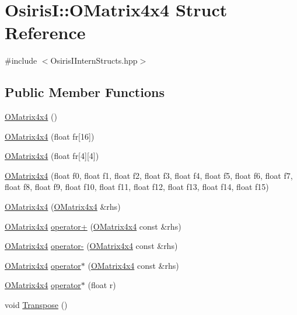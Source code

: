 \hypertarget{struct_osiris_i_1_1_o_matrix4x4}{\section{Osiris\-I\-:\-:O\-Matrix4x4 Struct Reference}
\label{struct_osiris_i_1_1_o_matrix4x4}
}


{\ttfamily \#include $<$Osiris\-I\-Intern\-Structs.\-hpp$>$}

\subsection*{Public Member Functions}
\begin{DoxyCompactItemize}
\item 
\hyperlink{struct_osiris_i_1_1_o_matrix4x4_ae5acc0e7919ce96adf6f6973d2d1c2a1}{O\-Matrix4x4} ()
\item 
\hyperlink{struct_osiris_i_1_1_o_matrix4x4_afedfdb77f304e823d5d5089d33df5e6e}{O\-Matrix4x4} (float fr\mbox{[}16\mbox{]})
\item 
\hyperlink{struct_osiris_i_1_1_o_matrix4x4_ab49b4aa64bdbd2a30412469de5f6f8b3}{O\-Matrix4x4} (float fr\mbox{[}4\mbox{]}\mbox{[}4\mbox{]})
\item 
\hyperlink{struct_osiris_i_1_1_o_matrix4x4_af575bd7166894f9fa08008a9c94caed0}{O\-Matrix4x4} (float f0, float f1, float f2, float f3, float f4, float f5, float f6, float f7, float f8, float f9, float f10, float f11, float f12, float f13, float f14, float f15)
\item 
\hyperlink{struct_osiris_i_1_1_o_matrix4x4_afe68ae85be836adee13fa3c379a2e991}{O\-Matrix4x4} (\hyperlink{struct_osiris_i_1_1_o_matrix4x4}{O\-Matrix4x4} \&rhs)
\item 
\hyperlink{struct_osiris_i_1_1_o_matrix4x4}{O\-Matrix4x4} \hyperlink{struct_osiris_i_1_1_o_matrix4x4_a2962c18c1d0bdd65e0d6e8e4d78b6830}{operator+} (\hyperlink{struct_osiris_i_1_1_o_matrix4x4}{O\-Matrix4x4} const \&rhs)
\item 
\hyperlink{struct_osiris_i_1_1_o_matrix4x4}{O\-Matrix4x4} \hyperlink{struct_osiris_i_1_1_o_matrix4x4_a42007ce580566d6d7031d8f02b7c1534}{operator-\/} (\hyperlink{struct_osiris_i_1_1_o_matrix4x4}{O\-Matrix4x4} const \&rhs)
\item 
\hyperlink{struct_osiris_i_1_1_o_matrix4x4}{O\-Matrix4x4} \hyperlink{struct_osiris_i_1_1_o_matrix4x4_aee32c86843495fc4acab0f76f96e0d6e}{operator$\ast$} (\hyperlink{struct_osiris_i_1_1_o_matrix4x4}{O\-Matrix4x4} const \&rhs)
\item 
\hyperlink{struct_osiris_i_1_1_o_matrix4x4}{O\-Matrix4x4} \hyperlink{struct_osiris_i_1_1_o_matrix4x4_aeac67d194accff6bc67acc02ad28bd02}{operator$\ast$} (float r)
\item 
void \hyperlink{struct_osiris_i_1_1_o_matrix4x4_aeafae0994359a16f76103ac316ff9dcf}{Transpose} ()
\end{DoxyCompactItemize}
